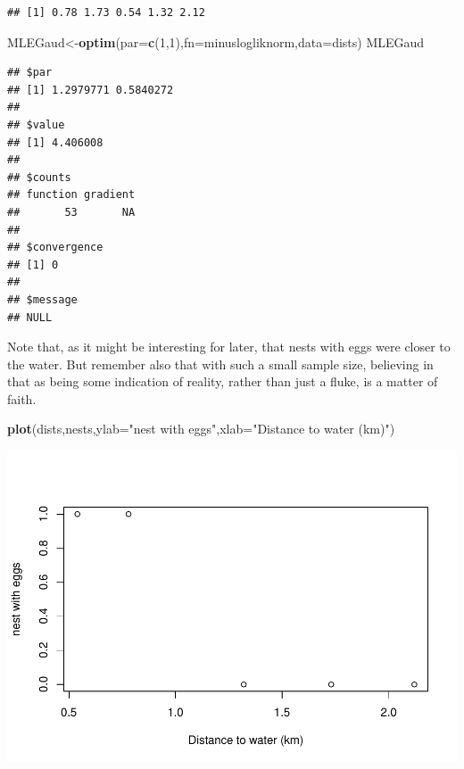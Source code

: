 \documentclass[
]{book}
\newenvironment{Shaded}{\begin{snugshade}}{\end{snugshade}}
\newcommand{\AttributeTok}[1]{\textcolor[rgb]{0.13,0.29,0.53}{#1}}
\newcommand{\DecValTok}[1]{\textcolor[rgb]{0.00,0.00,0.81}{#1}}
\newcommand{\FunctionTok}[1]{\textcolor[rgb]{0.13,0.29,0.53}{\textbf{#1}}}
\newcommand{\NormalTok}[1]{#1}
\newcommand{\OtherTok}[1]{\textcolor[rgb]{0.56,0.35,0.01}{#1}}
\newcommand{\StringTok}[1]{\textcolor[rgb]{0.31,0.60,0.02}{#1}}
\begin{document}
\begin{verbatim}
## [1] 0.78 1.73 0.54 1.32 2.12
\end{verbatim}

\begin{Shaded}
\begin{Highlighting}[]
\NormalTok{MLEGaud}\OtherTok{\textless{}{-}}\FunctionTok{optim}\NormalTok{(}\AttributeTok{par=}\FunctionTok{c}\NormalTok{(}\DecValTok{1}\NormalTok{,}\DecValTok{1}\NormalTok{),}\AttributeTok{fn=}\NormalTok{minuslogliknorm,}\AttributeTok{data=}\NormalTok{dists)}
\NormalTok{MLEGaud}
\end{Highlighting}
\end{Shaded}

\begin{verbatim}
## $par
## [1] 1.2979771 0.5840272
## 
## $value
## [1] 4.406008
## 
## $counts
## function gradient 
##       53       NA 
## 
## $convergence
## [1] 0
## 
## $message
## NULL
\end{verbatim}

Note that, as it might be interesting for later, that nests with eggs were closer to the water. But remember also that with such a small sample size, believing in that as being some indication of reality, rather than just a fluke, is a matter of faith.

\begin{Shaded}
\begin{Highlighting}[]
\FunctionTok{plot}\NormalTok{(dists,nests,}\AttributeTok{ylab=}\StringTok{"nest with eggs"}\NormalTok{,}\AttributeTok{xlab=}\StringTok{"Distance to water (km)"}\NormalTok{)}
\end{Highlighting}
\end{Shaded}

\includegraphics{ECOMODbook_files/figure-latex/ch13.24-1.pdf}
\end{document}
